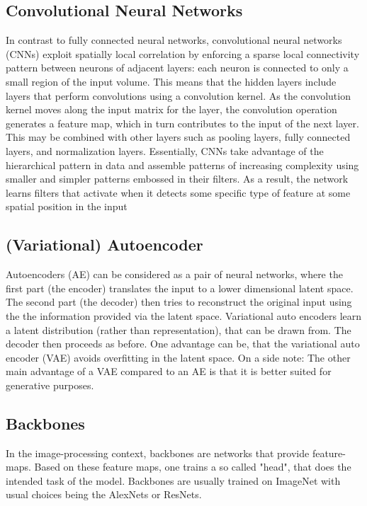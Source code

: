 \subsection{Convolutional Neural Networks}
In contrast to fully connected neural networks, convolutional neural networks (CNNs) exploit spatially local correlation by enforcing a sparse local connectivity pattern between neurons of adjacent layers: each neuron is connected to only a small region of the input volume.
This means that the hidden layers include layers that perform convolutions using a convolution kernel. As the convolution kernel moves along the input matrix for the layer, the convolution operation generates a feature map, which in turn contributes to the input of the next layer. This may be combined with other layers such as pooling layers, fully connected layers, and normalization layers. Essentially, CNNs take advantage of the hierarchical pattern in data and assemble patterns of increasing complexity using smaller and simpler patterns embossed in their filters. As a result, the network learns filters that activate when it detects some specific type of feature at some spatial position in the input

\subsection{(Variational) Autoencoder}
Autoencoders (AE) can be considered as a pair of neural networks, where the first part (the encoder) translates the input to a lower dimensional latent space. The second part (the decoder) then tries to reconstruct the original input using the the information provided via the latent space. Variational auto encoders learn a latent distribution (rather than representation), that can be drawn from. The decoder then proceeds as before. One advantage can be, that the variational auto encoder (VAE) avoids overfitting in the latent space. On a side note: The other main advantage of a VAE compared to an AE is that it is better suited for generative purposes.

\subsection{Backbones}
In the image-processing context, backbones are networks that provide feature-maps. Based on these feature maps, one trains a so called "head", that does the intended task of the model. Backbones are usually trained on ImageNet with usual choices being the AlexNets or ResNets.

